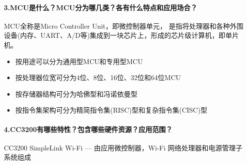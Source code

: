 \documentclass[a4paper]{ctexart}
\begin{document}
  \paragraph{3.MCU是什么？MCU分为哪几类？各有什么特点和应用场合？\\}

  \quad MCU全称是Micro Controller Unit，即微控制器单元，
  是指将处理器和各种外围设备(内存、UART、A/D等)集成到一块芯片上，形成的芯片级计算机，即单片机。

  \begin{itemize}
    \item 按用途可以分为通用型MCU和专用型MCU
    \item 按处理器位宽可分为4位、8位、16位、32位和64位MCU
    \item 按存储器结构可分为哈佛型和冯诺依曼型
    \item 按指令集架构可分为精简指令集(RISC)型和复杂指令集(CISC)型
  \end{itemize}

  \paragraph{4.CC3200有哪些特性？包含哪些硬件资源？应用范围？\\}
  CC3200 SimpleLink Wi-Fi — 由应用微控制器，Wi-Fi 网络处理器和电源管理子系统组成
\end{document}
